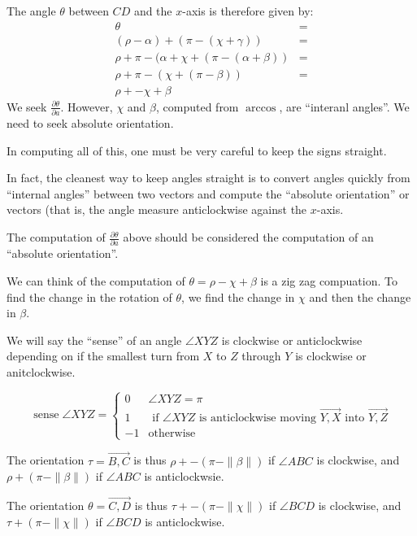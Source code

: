 \documentclass[11pt]{article}
\DeclareMathOperator{\sense}{sense}
\begin{document}
The angle $\theta$ between $CD$ and the $x$-axis is therefore given by:
\begin{align*}
  \theta &= \\
  (\rho - \alpha) + (\pi - (\chi + \gamma)) &= \\
\rho + \pi - (\alpha + \chi + (\pi - (\alpha + \beta)) &= \\
\rho + \pi - (\chi + (\pi  -\beta))  &= \\
\rho + -\chi + \beta
\end{align*}
We seek $\frac{\partial \theta}{\partial a}$. However, $\chi$ and $\beta$, computed from $\arccos$,
are ``interanl angles''. We need to seek absolute orientation.

In computing all of this, one must be very careful to keep the signs straight.

In fact, the cleanest way to keep angles straight is to convert angles quickly from ``internal angles'' between two vectors
and compute the ``absolute orientation'' or vectors (that is, the angle measure anticlockwise against the $x$-axis.

The computation of $\frac{\partial \theta}{\partial a}$ above should be considered the computation of an
``absolute orientation''.

We can think of the computation of $\theta = \rho - \chi + \beta$ is a zig zag compuation.
To find the change in the rotation of $\theta$, we find the change in $\chi$ and then the change in $\beta$.

We will say the ``sense'' of an angle $\angle XYZ$  is clockwise or anticlockwise depending on if the
smallest turn from $X$ to $Z$ through $Y$ is clockwise or anitclockwise.

\[
\sense{\angle XYZ} =
\begin{cases}
  0 & \angle XYZ = \pi \\
      1 & \text{ if } \angle XYZ \text{ is anticlockwise moving } \overrightarrow{Y,X} \text{ into } \overrightarrow{Y,Z} \\
      -1 & \text{otherwise}
    \end{cases}
\]

The orientation $\tau = \overrightarrow{B,C}$ is thus $\rho + -(\pi - \|\beta\|)$ if $\angle ABC$ is clockwise,
and $\rho + (\pi - \|\beta\|)$ if $\angle ABC$ is anticlockwsie.

The orientation $\theta = \overrightarrow{C,D}$ is thus $\tau + -(\pi - \|\chi\|)$  if $\angle BCD$ is clockwise,
and $\tau + (\pi - \|\chi\|)$ if $\angle BCD$ is anticlockwise.
\end{document}
